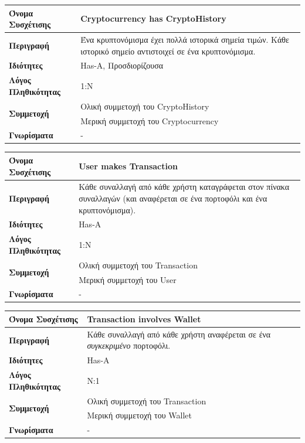 \vspace{1cm}

\noindent
\begin{tabular}{|p{4cm}|p{10cm}|}
\hline
\textbf{Όνομα Συσχέτισης} & Cryptocurrency has CryptoHistory \\ \hline
\textbf{Περιγραφή} & Ένα κρυπτονόμισμα έχει πολλά ιστορικά σημεία τιμών. Κάθε ιστορικό σημείο αντιστοιχεί σε ένα κρυπτονόμισμα. \\ \hline
\textbf{Ιδιότητες} & Has-A, Προσδιορίζουσα \\ \hline
\textbf{Λόγος Πληθικότητας} & 1:N \\ \hline
\multirow{2}{4cm}{\textbf{Συμμετοχή}} 
& Ολική συμμετοχή του CryptoHistory \\
\cline{2-2}
& Μερική συμμετοχή του Cryptocurrency \\
\hline
\textbf{Γνωρίσματα} & - \\ \hline
\end{tabular}


\vspace{1cm}

\noindent
\begin{tabular}{|p{4cm}|p{10cm}|}
\hline
\textbf{Όνομα Συσχέτισης} & User makes Transaction \\ \hline
\textbf{Περιγραφή} & Κάθε συναλλαγή από κάθε χρήστη καταγράφεται στον πίνακα συναλλαγών (και αναφέρεται σε ένα πορτοφόλι και ένα κρυπτονόμισμα). \\ \hline
\textbf{Ιδιότητες} & Has-A \\ \hline
\textbf{Λόγος Πληθικότητας} & 1:N \\ \hline
\multirow{2}{4cm}{\textbf{Συμμετοχή}} 
& Ολική συμμετοχή του Transaction \\
\cline{2-2}
& Μερική συμμετοχή του User \\
\hline
\textbf{Γνωρίσματα} & - \\ \hline
\end{tabular}


\vspace{1cm}

\noindent
\begin{tabular}{|p{4cm}|p{10cm}|}
\hline
\textbf{Όνομα Συσχέτισης} & Transaction involves Wallet \\ \hline
\textbf{Περιγραφή} & Κάθε συναλλαγή από κάθε χρήστη αναφέρεται σε ένα \textit{συγκεκριμένο} πορτοφόλι. \\ \hline
\textbf{Ιδιότητες} & Has-A \\ \hline
\textbf{Λόγος Πληθικότητας} & Ν:1 \\ \hline
\multirow{2}{4cm}{\textbf{Συμμετοχή}} 
& Ολική συμμετοχή του Transaction \\
\cline{2-2}
& Μερική συμμετοχή του Wallet \\
\hline
\textbf{Γνωρίσματα} & - \\ \hline
\end{tabular}

